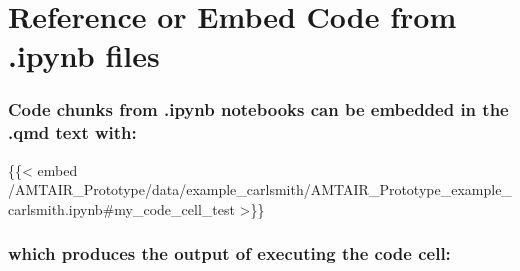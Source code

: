 \documentclass[
  11pt,
  letterpaper,
]{book}
\newenvironment{Shaded}{\begin{snugshade}}{\end{snugshade}}
\newcommand{\NormalTok}[1]{\textcolor[rgb]{0.00,0.23,0.31}{#1}}
\begin{document}
\section*{Reference or Embed Code from .ipynb
files}\label{reference-or-embed-code-from-.ipynb-files}


\subsubsection*{Code chunks from .ipynb notebooks can be embedded in the
.qmd text
with:}\label{code-chunks-from-.ipynb-notebooks-can-be-embedded-in-the-.qmd-text-with}

\begin{Shaded}
\begin{Highlighting}[]
\NormalTok{\{\{\textless{} embed /AMTAIR\_Prototype/data/example\_carlsmith/AMTAIR\_Prototype\_example\_carlsmith.ipynb\#my\_code\_cell\_test \textgreater{}\}\}}
\end{Highlighting}
\end{Shaded}

\subsubsection*{which produces the output of executing the code
cell:}\label{which-produces-the-output-of-executing-the-code-cell}
\end{document}
